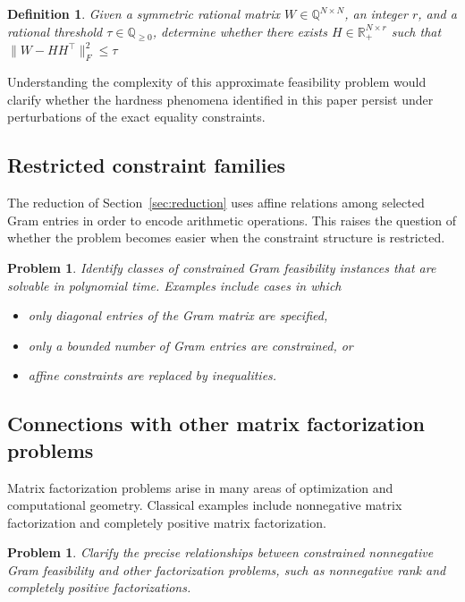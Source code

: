 \documentclass[11pt]{article}
\newtheorem{definition}[theorem]{Definition}
\newtheorem{problem}[theorem]{Problem}
\begin{document}
\begin{definition}
Given a symmetric rational matrix $W\in\mathbb{Q}^{N\times N}$, an integer $r$,
and a rational threshold $\tau\in\mathbb{Q}_{\ge 0}$, determine whether there exists
$H \in \mathbb{R}_+^{N\times r}$ such that $\|W - HH^\top\|_F^2 \le \tau$
\end{definition}

Understanding the complexity of this approximate feasibility problem
would clarify whether the hardness phenomena identified in this paper
persist under perturbations of the exact equality constraints.

\subsection{Restricted constraint families}

The reduction of Section~\ref{sec:reduction} uses affine relations
among selected Gram entries in order to encode arithmetic operations.
This raises the question of whether the problem becomes easier when
the constraint structure is restricted.

\begin{problem}
Identify classes of constrained Gram feasibility instances that are
solvable in polynomial time. Examples include cases in which
\begin{itemize}[leftmargin=2em]
\item only diagonal entries of the Gram matrix are specified,
\item only a bounded number of Gram entries are constrained, or
\item affine constraints are replaced by inequalities.
\end{itemize}
\end{problem}

\subsection{Connections with other matrix factorization problems}

Matrix factorization problems arise in many areas of optimization and
computational geometry. Classical examples include nonnegative matrix
factorization and completely positive matrix factorization.

\begin{problem}
Clarify the precise relationships between constrained nonnegative
Gram feasibility and other factorization problems, such as
nonnegative rank and completely positive factorizations.
\end{problem}
\end{document}

